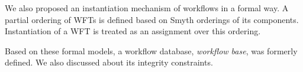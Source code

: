 We also proposed an instantiation mechanism of workflows in a formal way.
A partial ordering of WFTs is defined based on Smyth orderings of its
components.  Instantiation of a WFT is treated as an assignment over this 
ordering.

Based on these formal models, a workflow database, \emph{workflow base},
was formerly defined.  We also discussed about its integrity constraints.

